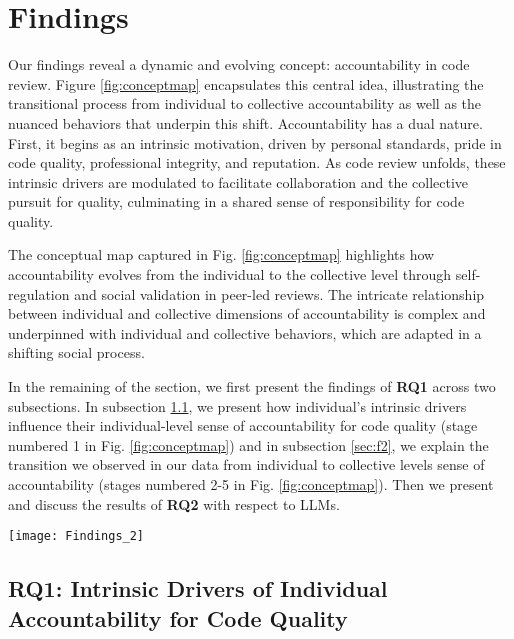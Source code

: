 \section{Findings}\label{sec:findings}

Our findings reveal a dynamic and evolving concept: accountability in code review. Figure \ref{fig:conceptmap} encapsulates this central idea, illustrating the transitional process from individual to collective accountability as well as the nuanced behaviors that underpin this shift. Accountability has a dual nature. First, it begins as an intrinsic motivation, driven by personal standards, pride in code quality, professional integrity, and reputation. As code review unfolds, these intrinsic drivers are modulated to facilitate collaboration and the collective pursuit for quality, culminating in a shared sense of responsibility for code quality.

The conceptual map captured in Fig. \ref{fig:conceptmap} highlights how accountability evolves from the individual to the collective level through self-regulation and social validation in peer-led reviews. The intricate relationship between individual and collective dimensions of accountability is complex and underpinned with individual and collective behaviors, which are adapted in a shifting social process.

In the remaining of the section, we first present the findings of \textbf{RQ1} across two subsections. In subsection \ref{sec:f1}, we present how individual's intrinsic drivers influence their individual-level sense of accountability for code quality (stage numbered 1 in Fig. \ref{fig:conceptmap}) and in subsection \ref{sec:f2}, we explain the transition we observed in our data from individual to collective levels sense of accountability  (stages numbered 2-5 in Fig. \ref{fig:conceptmap}). Then we present and discuss the results of \textbf{RQ2} with respect to LLMs.

\begin{figure*}[!t]
    \texttt{[image: Findings\_2]}
        \caption{The process of accountability for code quality combining Phase I \& II findings.}
        \label{fig:conceptmap}
\end{figure*} 

\subsection{RQ1: Intrinsic Drivers of Individual Accountability for Code Quality}\label{sec:f1}

